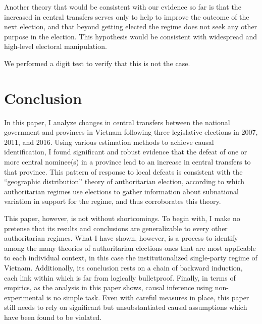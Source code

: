 \documentclass[12pt]{article}\usepackage[]{graphicx}\usepackage[]{color}
\newcommand{\1}{\mathbbm{1}}
\begin{document}
Another theory that would be consistent with our evidence so far is that the increased in central transfers serves only to help to improve the outcome of the next election, and that beyond getting elected the regime does not seek any other purpose in the election. This hypothesis would be consistent with widespread and high-level electoral manipulation.

We performed a digit test to verify that this is not the case.

\section{Conclusion}
\label{sec:conclusion}

In this paper, I analyze changes in central transfers between the national government and provinces in Vietnam following three legislative elections in 2007, 2011, and 2016. Using various estimation methods to achieve causal identification, I found significant and robust evidence that the defeat of one or more central nominee(s) in a province lead to an increase in central transfers to that province. This pattern of response to local defeats is consistent with the ``geographic distribution'' theory of authoritarian election, according to which authoritarian regimes use elections to gather information about subnational variation in support for the regime, and thus corroborates this theory.

This paper, however, is not without shortcomings. To begin with, I make no pretense that its results and conclusions are generalizable to every other authoritarian regimes. What I have shown, however, is a process to identify among the many theories of authoritarian elections ones that are most applicable to each individual context, in this case the institutionalized single-party regime of Vietnam. Additionally, its conclusion rests on a chain of backward induction, each link within which is far from logically bulletproof. Finally, in terms of empirics, as the analysis in this paper shows, causal inference using non-experimental is no simple task. Even with careful measures in place, this paper still needs to rely on significant but unsubstantiated causal assumptions which have been found to be violated. 
\end{document}
